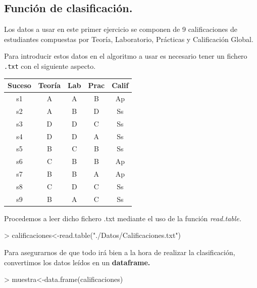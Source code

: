 \documentclass [a4paper] {article}
\begin{document}
\subsection{Función de clasificación.}
Los datos a usar en este primer ejercicio se componen de 9 calificaciones de estudiantes compuestas por
Teoría, Laboratorio, Prácticas y Calificación Global.

\bigskip
Para introducir estos datos en el algoritmo a usar es necesario tener un fichero \texttt{.txt} con el
siguiente aspecto.
\begin{table}[H]
\begin{center}
\begin{tabular}{|c|c|c|c|c|}
\hline
Suceso & Teoría & Lab & Prac & Calif\\
\hline \hline
s1 & A & A & B & Ap \\ \hline
s2 & A & B & D & Ss \\ \hline
s3 & D & D & C & Ss \\ \hline
s4 & D & D & A & Ss \\ \hline
s5 & B & C & B & Ss \\ \hline
s6 & C & B & B & Ap \\ \hline
s7 & B & B & A & Ap \\ \hline
s8 & C & D & C & Ss \\ \hline
s9 & B & A & C & Ss \\ \hline
\end{tabular}
\end{center}
\end{table}

\bigskip
Procedemos a leer dicho fichero .txt mediante el uso de la función \textit{read.table.}
\begin{Schunk}
\begin{Sinput}
> calificaciones<-read.table("./Datos/Calificaciones.txt")
\end{Sinput}
\end{Schunk}

\bigskip
Para asegurarnos de que todo irá bien a la hora de realizar la clasificación, convertimos los datos
leídos en un \textbf{dataframe.}
\begin{Schunk}
\begin{Sinput}
> muestra<-data.frame(calificaciones)
\end{Sinput}
\end{Schunk}

\end{document}
